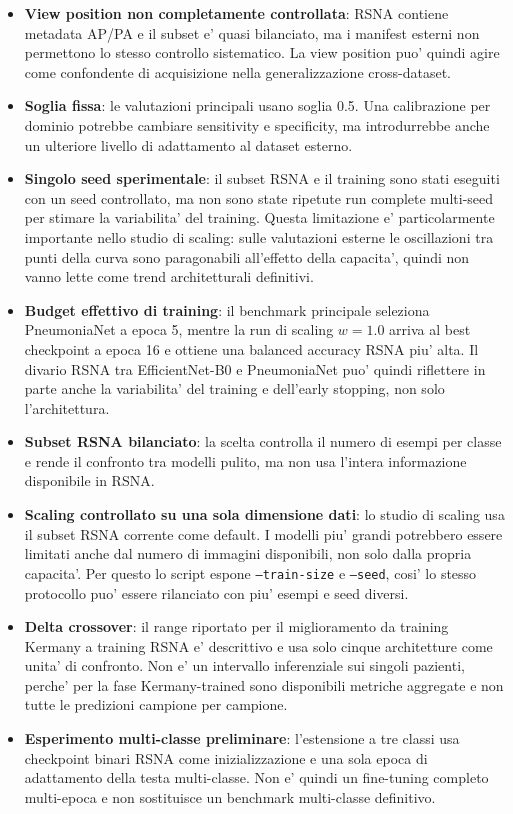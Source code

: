 \documentclass[11pt,a4paper]{article}
\newcommand{\balacc}{balanced accuracy}
\begin{document}
\begin{itemize}
  \item \textbf{View position non completamente controllata}: RSNA contiene
  metadata AP/PA e il subset e' quasi bilanciato, ma i manifest esterni non
  permettono lo stesso controllo sistematico. La view position puo' quindi agire
  come confondente di acquisizione nella generalizzazione cross-dataset.
  \item \textbf{Soglia fissa}: le valutazioni principali usano soglia 0.5. Una
  calibrazione per dominio potrebbe cambiare sensitivity e specificity, ma
  introdurrebbe anche un ulteriore livello di adattamento al dataset esterno.
  \item \textbf{Singolo seed sperimentale}: il subset RSNA e il training sono
  stati eseguiti con un seed controllato, ma non sono state ripetute run
  complete multi-seed per stimare la variabilita' del training. Questa
  limitazione e' particolarmente importante nello studio di scaling: sulle
  valutazioni esterne le oscillazioni tra punti della curva sono paragonabili
  all'effetto della capacita', quindi non vanno lette come trend architetturali
  definitivi.
  \item \textbf{Budget effettivo di training}: il benchmark principale seleziona
  PneumoniaNet a epoca 5, mentre la run di scaling \(w=1.0\) arriva al best
  checkpoint a epoca 16 e ottiene una \balacc{} RSNA piu' alta. Il divario RSNA
  tra EfficientNet-B0 e PneumoniaNet puo' quindi riflettere in parte anche la
  variabilita' del training e dell'early stopping, non solo l'architettura.
  \item \textbf{Subset RSNA bilanciato}: la scelta controlla il numero di esempi
  per classe e rende il confronto tra modelli pulito, ma non usa l'intera
  informazione disponibile in RSNA.
  \item \textbf{Scaling controllato su una sola dimensione dati}: lo studio di
  scaling usa il subset RSNA corrente come default. I modelli piu' grandi
  potrebbero essere limitati anche dal numero di immagini disponibili, non solo
  dalla propria capacita'. Per questo lo script espone \texttt{--train-size} e
  \texttt{--seed}, cosi' lo stesso protocollo puo' essere rilanciato con piu'
  esempi e seed diversi.
  \item \textbf{Delta crossover}: il range riportato per il miglioramento da
  training Kermany a training RSNA e' descrittivo e usa solo cinque architetture
  come unita' di confronto. Non e' un intervallo inferenziale sui singoli
  pazienti, perche' per la fase Kermany-trained sono disponibili metriche
  aggregate e non tutte le predizioni campione per campione.
  \item \textbf{Esperimento multi-classe preliminare}: l'estensione a tre classi
  usa checkpoint binari RSNA come inizializzazione e una sola epoca di
  adattamento della testa multi-classe. Non e' quindi un fine-tuning completo
  multi-epoca e non sostituisce un benchmark multi-classe definitivo.
\end{itemize}
\end{document}
